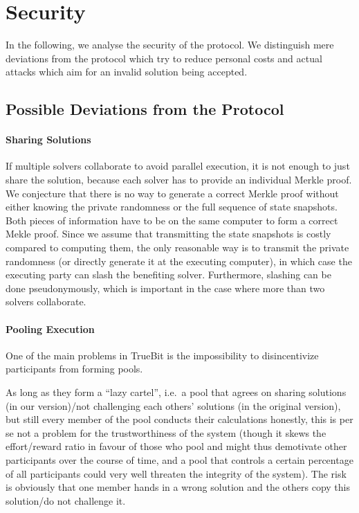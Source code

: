 \documentclass[a4paper]{article}
\begin{document}
\section{Security}

In the following, we analyse the security of the protocol.
We distinguish mere deviations from the protocol which try to reduce personal costs
and actual attacks which aim for an invalid solution being accepted.

\subsection{Possible Deviations from the Protocol}

\paragraph{Sharing Solutions}
If multiple solvers collaborate to avoid parallel execution, it is not enough
to just share the solution, because each solver has to provide an individual
Merkle proof. We conjecture that there is no way to generate a correct
Merkle proof without either knowing the private randomness or the full
sequence of state snapshots. Both pieces of information have to be on
the same computer to form a correct Mekle proof. Since we assume that
transmitting the state snapshots is costly compared to computing them,
the only reasonable way is to transmit the private randomness (or
directly generate it at the executing computer), in which case
the executing party can slash the benefiting solver.
Furthermore, slashing can be done pseudonymously, which is important in the
case where more than two solvers collaborate.

\paragraph{Pooling Execution}
One of the main problems in TrueBit is the impossibility to disincentivize participants from forming pools.

As long as they form a ``lazy cartel'', i.e.\ a pool that agrees on sharing solutions (in our version)/not challenging each others' solutions (in the original version), but still every member of the pool conducts their calculations honestly, this is per se not a problem for the trustworthiness of the system (though it skews the effort/reward ratio in favour of those who pool and might thus demotivate other participants over the course of time, and a pool that controls a certain percentage of all participants could very well threaten the integrity of the system). The risk is obviously that one member hands in a wrong solution and the others copy this solution/do not challenge it. 
\end{document}
